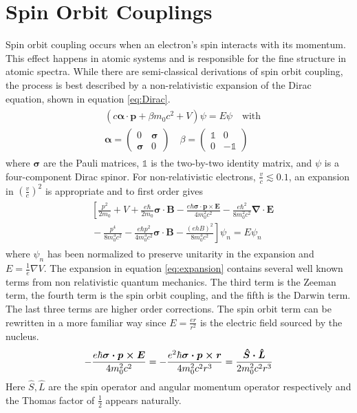 \documentclass[12pt]{article}
\newcommand{\newln}{\\&{}}
\begin{document}
\section{Spin Orbit Couplings}
Spin orbit coupling occurs when an electron's spin interacts with its momentum.
This effect happens in atomic systems and is responsible for the fine structure in atomic spectra.
While there are semi-classical derivations of spin orbit coupling, the process is best described by a non-relativistic expansion of the Dirac equation\cite{Winkler}, shown in equation \ref{eq:Dirac}.
\begin{align}\begin{split}
  \label{eq:Dirac}
  & (c\boldsymbol{\alpha\cdot p}+\beta m_{0}c^2+V)\psi=E\psi \quad\text{with}\newln\boldsymbol{\alpha}=\left(\begin{array}{cc} 0 & \boldsymbol{\sigma} \\ \boldsymbol{\sigma} & 0 \end{array} \right) \quad \beta=\left(\begin{array}{cc} \mathbb{1} & 0 \\ 0 & -\mathbb{1} \end{array} \right)
\end{split}\end{align}
where $\boldsymbol\sigma$ are the Pauli matrices, $\mathbb{1}$ is the two-by-two identity matrix, and $\psi$ is a four-component Dirac spinor.
For non-relativistic electrons, $\frac{v}{c}\lesssim 0.1$, an expansion in $(\frac{v}{c})^2$ is appropriate and  to first order gives
\begin{align}\begin{split}
  \label{eq:expansion}
  & \left [ \frac{p^2}{2m_0}\right.+V+\frac{e\hbar}{2m_0}\boldsymbol{\sigma\cdot B}-\frac{e\hbar\boldsymbol{\sigma\cdot p \times E}}{4m_0^2c^2}-\frac{e\hbar^2}{8m_0^2c^2}\boldsymbol{\nabla\cdot E} \newln-\frac{p^4}{8m_0^3c^2}-\frac{e\hbar p^2}{4m_0^3c^2}\boldsymbol{\sigma \cdot B}-\left.\frac{(ehB)^2}{8m_0^3c^2}\right]\psi_n=E\psi_n
\end{split}\end{align}
where $\psi_n$ has been normalized to preserve unitarity in the expansion and $E=\frac{1}{e}\nabla V$.
The expansion in equation \ref{eq:expansion} contains several well known terms from non relativistic quantum mechanics.
The third term is the Zeeman term, the fourth term is the spin orbit coupling, and the fifth is the Darwin term.
The last three terms are higher order corrections.
The spin orbit term can be rewritten in a more familiar way since $E=\frac{e\hat{r}}{r^2}$ is the electric field sourced by the nucleus.
\begin{align}
  \label{eq:soc}
  -\frac{e\hbar\boldsymbol{\sigma\cdot p \times E}}{4m_0^2c^2}=-\frac{e^2\hbar\boldsymbol{\sigma\cdot p \times r}}{4m_0^2c^2r^3}\newline=\frac{\boldsymbol{\hat{S}\cdot \hat{L}}}{2m_0^2c^2r^3}
\end{align}
Here $\hat{S}, \hat{L}$ are the spin operator and angular momentum operator respectively and the Thomas factor of $\frac{1}{2}$ appears naturally.
\end{document}
